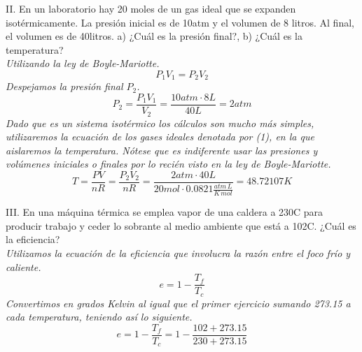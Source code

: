 \documentclass{article}
\begin{document}
\noindent II. En un laboratorio hay 20 moles de un gas ideal que se expanden isotérmicamente. La presión inicial es de 10atm y el volumen de 8 litros. Al final, el volumen es de 40litros. a) ¿Cuál es la presión final?, b) ¿Cuál es la temperatura? \\
\textit{Utilizando la ley de Boyle-Mariotte.}
\begin{equation}
    P_1V_1 = P_2V_2
\end{equation}
\textit{Despejamos la presión final $P_2$.} \\
\begin{equation*}
    P_2 = \frac{P_1V_1}{V_2} = \frac{10atm \cdot 8L}{40L} = 2atm
\end{equation*}
\textit{Dado que es un sistema isotérmico los cálculos son mucho más simples, utilizaremos la ecuación de los gases ideales denotada por (1), en la que aislaremos la temperatura. Nótese que es indiferente usar las presiones y volúmenes iniciales o finales por lo recién visto en la ley de Boyle-Mariotte.}
\begin{equation*}
    T = \frac{PV}{nR} = \frac{P_2V_2}{nR} = \frac{2atm \cdot 40L}{20mol \cdot 0.0821 \frac{atm \, L}{K \, mol}} = 48.72107K
\end{equation*}

\noindent III. En una máquina térmica se emplea vapor de una caldera a 230C para producir trabajo y ceder lo sobrante al medio ambiente que está a 102C. ¿Cuál es la eficiencia? \\
\textit{Utilizamos la ecuación de la eficiencia que involucra la razón entre el foco frío y caliente.}
\begin{equation}
    e = 1 - \frac{T_f}{T_c}
\end{equation}
\textit{Convertimos en grados Kelvin al igual que el primer ejercicio sumando 273.15 a cada temperatura, teniendo así lo siguiente.}
\begin{equation*}
    e = 1 - \frac{T_f}{T_c} = 1 - \frac{102+273.15}{230+273.15} 
\end{equation*}
\end{document}
